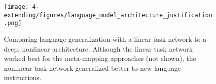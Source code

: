\begin{figure}
\texttt{[image: 4-extending/figures/language\_model\_architecture\_justification.png]}
\caption{Comparing language generalization with a linear task network to a deep, nonlinear architecture. Although the linear task network worked best for the meta-mapping approaches (not shown), the nonlinear task network generalized better to new language instructions.}
\end{figure}
